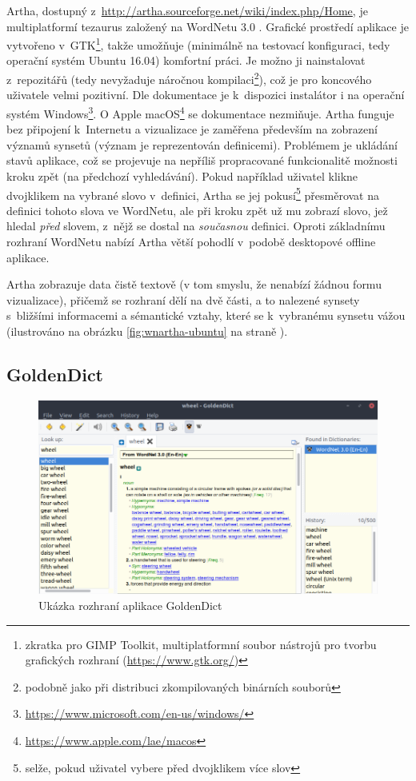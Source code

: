 \documentclass[a4paper,11pt,openany,twoside]{book}
\begin{document}
				Artha, dostupný z~\url{http://artha.sourceforge.net/wiki/index.php/Home}, je multiplatformí tezaurus založený na WordNetu 3.0 \parencite{ramaswamy2012}. Grafické prostředí aplikace je vytvořeno v~GTK\footnote{zkratka pro GIMP Toolkit, multiplatformní soubor nástrojů pro tvorbu grafických rozhraní (\url{https://www.gtk.org/})}, takže umožňuje (minimálně na testovací konfiguraci, tedy operační systém Ubuntu 16.04) komfortní práci. Je možno ji nainstalovat z~repozitářů (tedy nevyžaduje náročnou kompilaci\footnote{podobně jako při distribuci zkompilovaných binárních souborů}), což je pro koncového uživatele velmi pozitivní. Dle dokumentace je k~dispozici instalátor i na operační systém Windows\footnote{\url{https://www.microsoft.com/en-us/windows/}}. O Apple macOS\footnote{\url{https://www.apple.com/lae/macos}} se dokumentace nezmiňuje. Artha funguje bez připojení k~Internetu a vizualizace je zaměřena především na zobrazení významů synsetů (význam je reprezentován definicemi). Problémem je ukládání stavů aplikace, což se projevuje na nepříliš propracované funkcionalitě možnosti kroku zpět (na předchozí vyhledávání). Pokud například uživatel klikne dvojklikem na vybrané slovo v~definici, Artha se jej pokusí\footnote{selže, pokud uživatel vybere před dvojklikem více slov} přesměrovat na definici tohoto slova ve WordNetu, ale při kroku zpět už mu zobrazí slovo, jež hledal \textit{před} slovem, z~nějž se dostal na \textit{současnou} definici. Oproti základnímu rozhraní WordNetu nabízí Artha větší pohodlí v~podobě desktopové offline aplikace.

				Artha zobrazuje data čistě textově (v tom smyslu, že nenabízí žádnou formu vizualizace), přičemž se rozhraní dělí na dvě části, a to nalezené synsety s~bližšími informacemi a sémantické vztahy, které se k~vybranému synsetu vážou (ilustrováno na obrázku \ref{fig:wnartha-ubuntu} na straně \pageref{fig:wnartha-ubuntu}). 

			\subsection{GoldenDict}
 		
 				\begin{figure}[h]
					\centering
					\includegraphics[width=1.0\textwidth]{wngoldendick-ubuntu.png}
					\caption{Ukázka rozhraní aplikace GoldenDict}
					\label{fig:wngoldendick-ubuntu}
				\end{figure}
\end{document}
